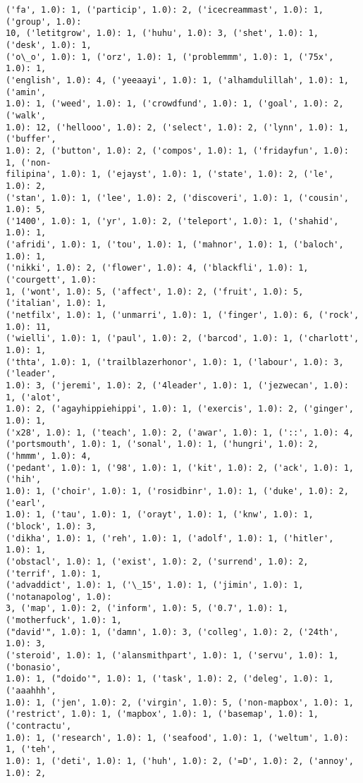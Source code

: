 \documentclass[11pt]{article}
\begin{document}
\begin{Verbatim}[commandchars=\\\{\}]
('fa', 1.0): 1, ('particip', 1.0): 2, ('icecreammast', 1.0): 1, ('group', 1.0):
10, ('letitgrow', 1.0): 1, ('huhu', 1.0): 3, ('shet', 1.0): 1, ('desk', 1.0): 1,
('o\_o', 1.0): 1, ('orz', 1.0): 1, ('problemmm', 1.0): 1, ('75x', 1.0): 1,
('english', 1.0): 4, ('yeeaayi', 1.0): 1, ('alhamdulillah', 1.0): 1, ('amin',
1.0): 1, ('weed', 1.0): 1, ('crowdfund', 1.0): 1, ('goal', 1.0): 2, ('walk',
1.0): 12, ('hellooo', 1.0): 2, ('select', 1.0): 2, ('lynn', 1.0): 1, ('buffer',
1.0): 2, ('button', 1.0): 2, ('compos', 1.0): 1, ('fridayfun', 1.0): 1, ('non-
filipina', 1.0): 1, ('ejayst', 1.0): 1, ('state', 1.0): 2, ('le', 1.0): 2,
('stan', 1.0): 1, ('lee', 1.0): 2, ('discoveri', 1.0): 1, ('cousin', 1.0): 5,
('1400', 1.0): 1, ('yr', 1.0): 2, ('teleport', 1.0): 1, ('shahid', 1.0): 1,
('afridi', 1.0): 1, ('tou', 1.0): 1, ('mahnor', 1.0): 1, ('baloch', 1.0): 1,
('nikki', 1.0): 2, ('flower', 1.0): 4, ('blackfli', 1.0): 1, ('courgett', 1.0):
1, ('wont', 1.0): 5, ('affect', 1.0): 2, ('fruit', 1.0): 5, ('italian', 1.0): 1,
('netfilx', 1.0): 1, ('unmarri', 1.0): 1, ('finger', 1.0): 6, ('rock', 1.0): 11,
('wielli', 1.0): 1, ('paul', 1.0): 2, ('barcod', 1.0): 1, ('charlott', 1.0): 1,
('thta', 1.0): 1, ('trailblazerhonor', 1.0): 1, ('labour', 1.0): 3, ('leader',
1.0): 3, ('jeremi', 1.0): 2, ('4leader', 1.0): 1, ('jezwecan', 1.0): 1, ('alot',
1.0): 2, ('agayhippiehippi', 1.0): 1, ('exercis', 1.0): 2, ('ginger', 1.0): 1,
('x28', 1.0): 1, ('teach', 1.0): 2, ('awar', 1.0): 1, ('::', 1.0): 4,
('portsmouth', 1.0): 1, ('sonal', 1.0): 1, ('hungri', 1.0): 2, ('hmmm', 1.0): 4,
('pedant', 1.0): 1, ('98', 1.0): 1, ('kit', 1.0): 2, ('ack', 1.0): 1, ('hih',
1.0): 1, ('choir', 1.0): 1, ('rosidbinr', 1.0): 1, ('duke', 1.0): 2, ('earl',
1.0): 1, ('tau', 1.0): 1, ('orayt', 1.0): 1, ('knw', 1.0): 1, ('block', 1.0): 3,
('dikha', 1.0): 1, ('reh', 1.0): 1, ('adolf', 1.0): 1, ('hitler', 1.0): 1,
('obstacl', 1.0): 1, ('exist', 1.0): 2, ('surrend', 1.0): 2, ('terrif', 1.0): 1,
('advaddict', 1.0): 1, ('\_15', 1.0): 1, ('jimin', 1.0): 1, ('notanapolog', 1.0):
3, ('map', 1.0): 2, ('inform', 1.0): 5, ('0.7', 1.0): 1, ('motherfuck', 1.0): 1,
("david'", 1.0): 1, ('damn', 1.0): 3, ('colleg', 1.0): 2, ('24th', 1.0): 3,
('steroid', 1.0): 1, ('alansmithpart', 1.0): 1, ('servu', 1.0): 1, ('bonasio',
1.0): 1, ("doido'", 1.0): 1, ('task', 1.0): 2, ('deleg', 1.0): 1, ('aaahhh',
1.0): 1, ('jen', 1.0): 2, ('virgin', 1.0): 5, ('non-mapbox', 1.0): 1,
('restrict', 1.0): 1, ('mapbox', 1.0): 1, ('basemap', 1.0): 1, ('contractu',
1.0): 1, ('research', 1.0): 1, ('seafood', 1.0): 1, ('weltum', 1.0): 1, ('teh',
1.0): 1, ('deti', 1.0): 1, ('huh', 1.0): 2, ('=D', 1.0): 2, ('annoy', 1.0): 2,

\end{Verbatim}
\end{document}
